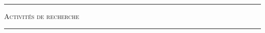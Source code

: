 \documentclass[a4paper,11pt]{article}
\newcommand{\titre}[1]{
  \begin{center}
    \rule{0.4\textwidth}{0.5pt}
    \par\vspace{0.1cm}
    \textsc{\large #1}
    \par\vspace{-0.2cm}
    \par\noindent\rule{0.4\textwidth}{0.5pt}
  \end{center}
}
\begin{document}
\titre{Activités de recherche}

\end{document}
